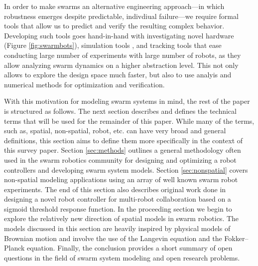 \documentclass[Main.tex]{subfiles}
\begin{document}
In order to make swarms an alternative engineering approach---in which robustness emerges despite predictable, indivdiual failure---we require formal tools that allow us to predict and verify the resulting complex behavior. Developing such tools goes hand-in-hand with investigating novel hardware (Figure \ref{fig:swarmbots}), simulation tools \cite{Michel1998}, and tracking 
tools \cite{correlliros06,lochmatter08} that ease conducting large number of experiments with large number of robots, as they allow analyzing swarm dynamics on a higher abstraction level. This not only allows to explore the design space much faster, but also to use analyis and numerical methods for optimization and verification. 



With this motivation for modeling swarm systems in mind, the rest of the paper is structured as follows. The next section describes and defines the technical terms that will be used for the remainder of this paper. While many of the terms, such as, spatial, non-spatial, robot, etc. can have very broad and general definitions, this section aims to define them more specifically in the context of this survey paper. Section \ref{sec:methods} outlines a general methodology often used in the swarm robotics community for designing and optimizing a robot controllers and developing swarm system models. Section \ref{sec:nonspatial} covers non-spatial modeling applications using an array of well known swarm robot experiments. The end of this section also describes original work done in designing a novel robot controller for multi-robot collaboration based on a sigmoid threshold response function. In the proceeding section we begin to explore the relatively new direction of spatial models in swarm robotics. The models discussed in this section are heavily inspired by physical models of Brownian motion and involve the use of the Langevin equation and the Fokker--Planck equation. Finally, the conclusion provides a short summary of open questions in the field of swarm system modeling and open research problems.
\end{document}
